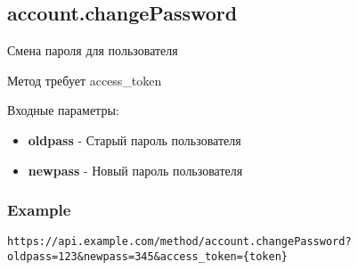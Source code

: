 \subsection{account.changePassword}
Смена пароля для пользователя

Метод требует access\_token

Входные параметры:
\begin{itemize}
  \item \textbf{oldpass} - Старый пароль пользователя
  \item \textbf{newpass} - Новый пароль пользователя
\end{itemize}

\subsubsection{Example}
\begin{Verbatim}[frame=single]
https://api.example.com/method/account.changePassword?oldpass=123&newpass=345&access_token={token}
\end{Verbatim}
